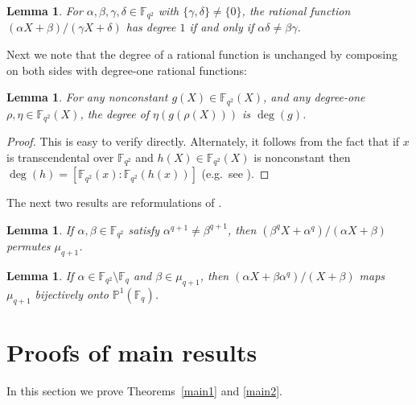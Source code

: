\documentclass[11pt]{amsart}
\numberwithin{equation}{section}
\newtheorem{lemma}[equation]{Lemma}
\theoremstyle{definition}
\newcommand{\F}{\mathbb{F}}
\newcommand{\bP}{\mathbb{P}}
\begin{document}
\begin{lemma}\label{who1}
For $\alpha,\beta,\gamma,\delta\in\F_{q^2}$ with $\{\gamma,\delta\}\ne\{0\}$, the rational function $(\alpha X+\beta)/(\gamma X+\delta)$ has degree $1$ if and only if $\alpha\delta\ne \beta\gamma$.
\end{lemma}

Next we note that the degree of a rational function is unchanged by composing on both sides with degree-one rational functions:

\begin{lemma}\label{deg}
For any nonconstant $g(X)\in\F_{q^2}(X)$, and any degree-one $\rho,\eta\in\F_{q^2}(X)$, the degree of $\eta(g(\rho(X)))$ is $\deg(g)$.
\end{lemma}

\begin{proof}
This is easy to verify directly.  Alternately, it follows from the fact that if $x$ is transcendental over $\F_{q^2}$ and $h(X)\in\F_{q^2}(X)$ is nonconstant then $\deg(h)=[\F_{q^2}(x):\F_{q^2}(h(x))]$ (e.g.\ see \cite[Lemma~2.2]{DZAA}).
\end{proof}

The next two results are reformulations of \cite[Lemmas~2.1 and 3.1]{ZR}.

\begin{lemma}\label{deg1mu}
If $\alpha,\beta\in\F_{q^2}$ satisfy $\alpha^{q+1}\ne\beta^{q+1}$, then $(\beta^qX+\alpha^q)/(\alpha X+\beta)$ 
permutes $\mu_{q+1}$.
\end{lemma}

\begin{lemma}\label{mu}
If $\alpha\in\F_{q^2}\setminus\F_q$ and $\beta\in\mu_{q+1}$, then $(\alpha X+\beta\alpha^q)/(X+\beta)$ maps $\mu_{q+1}$ bijectively onto\/ $\bP^1(\F_q)$.
\end{lemma}




\section{Proofs of main results} \label{secproofs}

In this section we prove Theorems~\ref{main1} and \ref{main2}.
\end{document}
